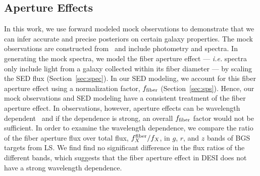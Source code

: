 

\subsection{Aperture Effects}
In this work, we use forward modeled mock observations to demonstrate that we
can infer accurate and precise posteriors on certain galaxy properties.
The mock observations are constructed from \lgal~and include photometry and
spectra. 
In generating the mock spectra, we model the fiber aperture effect ---
\emph{i.e.} spectra only include light from a galaxy collected within its fiber
diameter --- by scaling the SED flux (Section~\ref{sec:spec}).
In our SED modeling, we account for this fiber aperture effect using a
normalization factor, $f_{\rm fiber}$ (Section~\ref{sec:sps}). 
Hence, our mock observations and SED modeling have a consistent treatment of
the fiber aperture effect. 
In observations, however, aperture effects can be wavelength
dependent~\citep{gerssen2012, richards2016} and if the dependence is strong,
an overall $f_{\rm fiber}$ factor would not be sufficient.
In order to examine the wavelength dependence, we compare the ratio of the
fiber aperture flux over total flux, $f^{\rm fiber}_X/f_X$, in $g$, $r$, and
$z$ bands of BGS targets from LS.
We find find no significant difference in the flux ratios of the different
bands, which suggests that the fiber aperture effect in DESI does not have a
strong wavelength dependence. 

